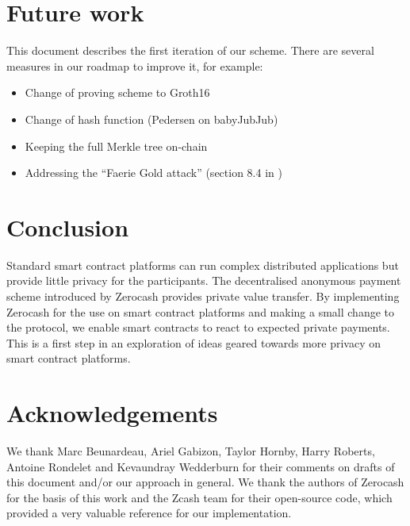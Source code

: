\documentclass{article}
\begin{document}
\section{Future work} \label{futurework}
This document describes the first iteration of our scheme. There are several measures in our roadmap to improve it, for example:
\begin{itemize}
    \item Change of proving scheme to Groth16
    \item Change of hash function (Pedersen on babyJubJub)
    \item Keeping the full Merkle tree on-chain
    \item Addressing the ``Faerie Gold attack'' (section 8.4 in \cite{zcash})
\end{itemize}

\section{Conclusion}
Standard smart contract platforms can run complex distributed applications but provide little privacy for the participants. The decentralised anonymous payment scheme introduced by Zerocash provides private value transfer. By implementing Zerocash for the use on smart contract platforms and making a small change to the protocol, we enable smart contracts to react to expected private payments. This is a first step in an exploration of ideas geared towards more privacy on smart contract platforms.

\section{Acknowledgements}
We thank Marc Beunardeau, Ariel Gabizon, Taylor Hornby, Harry Roberts, Antoine Rondelet and Kevaundray Wedderburn for their comments on drafts of this document and/or our approach in general. We thank the authors of Zerocash for the basis of this work and the Zcash team for their open-source code, which provided a very valuable reference for our implementation.

\printbibliography
\end{document}
